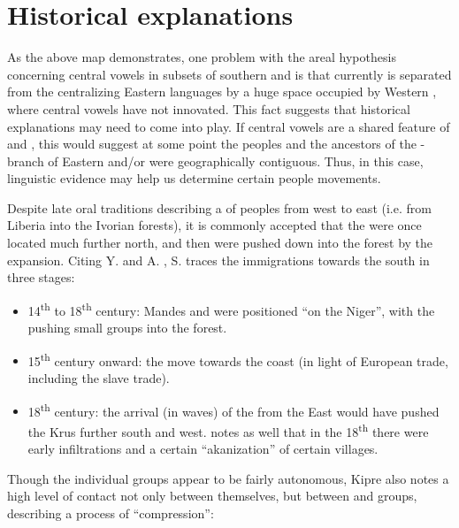 \documentclass[output=paper,newtxmath,modfonts,nonflat,draft]{langsci/langscibook}
\begin{document}
\section{Historical explanations}\label{sec:zogbo:6} 

As the above map demonstrates, one problem with the areal hypothesis concerning central vowels in subsets of southern  and  is that currently  is separated from the centralizing Eastern languages by a huge space occupied by Western , where central vowels have not innovated. This fact suggests that historical explanations may need to come into play. If central vowels are a shared feature of  and , this would suggest at some point the  peoples and the ancestors of the - branch of Eastern  and/or  were geographically contiguous. Thus, in this case, linguistic evidence may help us determine certain people movements.   

Despite late oral traditions describing a  of  peoples from west to east (i.e. from Liberia into the Ivorian forests), it is commonly accepted that the  were once located much further north, and then were pushed down into the forest by the  expansion. Citing Y. \citet{Person1964} and A. \citet{Schwartz1970}, S. \citet{Lafage1983} traces the  immigrations towards the south in three stages:

\begin{itemize}
\item 14\textsuperscript{th} to 18\textsuperscript{th} century: Mandes and  were positioned “on the Niger”, with the  pushing small  groups into the forest.\\[-0.75cm] 
\item 15\textsuperscript{th} century onward: the  move towards the coast (in light of European trade, including the slave trade). \\[-0.75cm]
\item 18\textsuperscript{th} century: the arrival (in waves) of the  from the East would have pushed the Krus further south and west. \citet[68]{kipre2005} notes as well that in the 18\textsuperscript{th} there were early  infiltrations and a certain “akanization” of certain  villages.
\end{itemize}

Though the individual  groups appear to be fairly autonomous, Kipre also notes a high level of contact not only between  themselves, but between  and  groups, describing a process of “compression”: 
\end{document}
